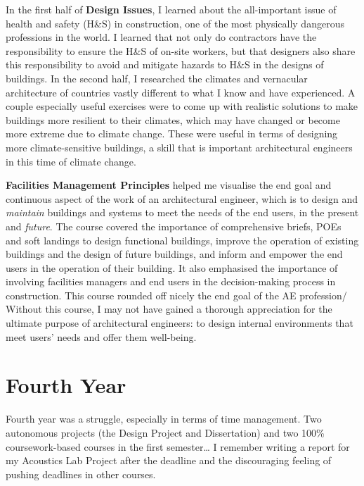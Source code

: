 In the first half of \textbf{Design Issues}, I learned about the all-important issue of health and safety (H\&S) in construction, one of the most physically dangerous professions in the world.
I learned that not only do contractors have the responsibility to ensure the H\&S of on-site workers, but that designers also share this responsibility to avoid and mitigate hazards to H\&S in the designs of buildings.
In the second half, I researched the climates and vernacular architecture of countries vastly different to what I know and have experienced.
A couple especially useful exercises were to come up with realistic solutions to make buildings more resilient to their climates, which may have changed or become more extreme due to climate change.
These were useful in terms of designing more climate-sensitive buildings, a skill that is important architectural engineers in this time of climate change.

\textbf{Facilities Management Principles} helped me visualise the end goal and continuous aspect of the work of an architectural engineer, which is to design and \emph{maintain} buildings and systems to meet the needs of the end users, in the present and \emph{future}.
The course covered the importance of comprehensive briefs, POEs and soft landings to design functional buildings, improve the operation of existing buildings and the design of future buildings, and inform and empower the end users in the operation of their building.
It also emphasised the importance of involving facilities managers and end users in the decision-making process in construction.
This course rounded off nicely the end goal of the AE profession/ Without this course, I may not have gained a thorough appreciation for the ultimate purpose of architectural engineers: to design internal environments that meet users' needs and offer them well-being.




\section{Fourth Year}

Fourth year was a struggle, especially in terms of time management.
Two autonomous projects (the Design Project and Dissertation) and two 100\% coursework-based courses in the first semester…
I remember writing a report for my Acoustics Lab Project after the deadline and the discouraging feeling of pushing deadlines in other courses.

